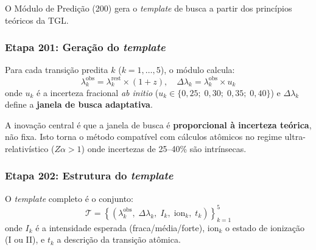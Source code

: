 \documentclass[12pt,a4paper]{article}
\begin{document}
O Módulo de Predição (200) gera o \textit{template} de busca a
partir dos princípios teóricos da TGL.

\subsubsection{Etapa 201: Geração do \textit{template}}

Para cada transição predita $k$ ($k = 1, \ldots, 5$), o módulo
calcula:
\begin{equation}
\lambda_k^{\text{obs}} = \lambda_k^{\text{rest}} \times (1 + z),
\quad
\Delta\lambda_k = \lambda_k^{\text{obs}} \times u_k
\label{eq:template}
\end{equation}
onde $u_k$ é a incerteza fracional \textit{ab initio}
($u_k \in \{0{,}25;\; 0{,}30;\; 0{,}35;\; 0{,}40\}$) e
$\Delta\lambda_k$ define a \textbf{janela de busca adaptativa}.

A inovação central é que a janela de busca é
\textbf{proporcional à incerteza teórica}, não fixa. Isto
torna o método compatível com cálculos atômicos no regime
ultra-relativístico ($Z\alpha > 1$) onde incertezas de 25--40\%
são intrínsecas.

\subsubsection{Etapa 202: Estrutura do \textit{template}}

O \textit{template} completo é o conjunto:
\begin{equation}
\mathcal{T} = \left\{
  \left(\lambda_k^{\text{obs}},\; \Delta\lambda_k,\;
  I_k,\; \text{ion}_k,\; t_k\right)
\right\}_{k=1}^{5}
\label{eq:template_completo}
\end{equation}
onde $I_k$ é a intensidade esperada (fraca/média/forte),
$\text{ion}_k$ o estado de ionização (I ou II), e $t_k$ a
descrição da transição atômica.
\end{document}

